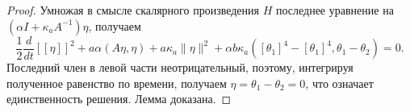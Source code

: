 \begin{proof}
    Умножая в смысле скалярного произведения $H$
    последнее уравнение на $\left(\alpha I+\kappa_{a} A^{-1}\right) \eta$,
    получаем
    \[
        \frac{1}{2} \frac{d}{d t}[[\eta]]^{2}
        +a \alpha(A \eta, \eta)
        +a \kappa_{a}\|\eta\|^{2}
        +\alpha b \kappa_{a}\left(\left[\theta_{1}\right]^{4}
        -\left[\theta_{1}\right]^{4}, \theta_{1}-\theta_{2}\right)=0.
    \]
    Последний член в левой части неотрицательный,
    поэтому, интегрируя полученное равенство по времени,
    получаем $\eta=\theta_{1}-\theta_{2}=0$, что означает единственность решения.
    Лемма доказана.

\end{proof}
